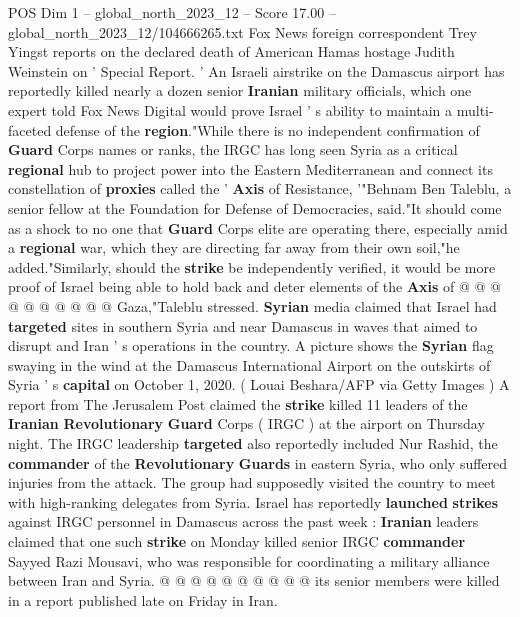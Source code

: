 \begin{textsample}{POS Dim 1 – global\_north\_2023\_12 – Score 17.00 – global\_north\_2023\_12/104666265.txt}  \label{ex:f1_pos_260}
Fox News foreign correspondent Trey Yingst reports on the declared death of American Hamas hostage Judith Weinstein on ' Special Report. ' An Israeli airstrike on the Damascus airport has reportedly killed nearly a dozen senior \textbf{Iranian} military officials, which one expert told Fox News Digital would prove Israel ' s ability to maintain a multi-faceted defense of the \textbf{region}."While there is no independent confirmation of \textbf{Guard} Corps names or ranks, the IRGC has long seen Syria as a critical \textbf{regional} hub to project power into the Eastern Mediterranean and connect its constellation of \textbf{proxies} called the ' \textbf{Axis} of Resistance, '"Behnam Ben Taleblu, a senior fellow at the Foundation for Defense of Democracies, said."It should come as a shock to no one that \textbf{Guard} Corps elite are operating there, especially amid a \textbf{regional} war, which they are directing far away from their own soil,"he added."Similarly, should the \textbf{strike} be independently verified, it would be more proof of Israel being able to hold back and deter elements of the \textbf{Axis} of @ @ @ @ @ @ @ @ @ @ Gaza,"Taleblu stressed. \textbf{Syrian} media claimed that Israel had \textbf{targeted} sites in southern Syria and near Damascus in waves that aimed to disrupt and Iran ' s operations in the country.
A picture shows the \textbf{Syrian} flag swaying in the wind at the Damascus International Airport on the outskirts of Syria ' s \textbf{capital} on October 1, 2020. ( Louai Beshara/AFP via Getty Images ) A report from The Jerusalem Post claimed the \textbf{strike} killed 11 leaders of the \textbf{Iranian} \textbf{Revolutionary} \textbf{Guard} Corps ( IRGC ) at the airport on Thursday night.
The IRGC leadership \textbf{targeted} also reportedly included Nur Rashid, the \textbf{commander} of the \textbf{Revolutionary} \textbf{Guards} in eastern Syria, who only suffered injuries from the attack.
The group had supposedly visited the country to meet with high-ranking delegates from Syria.
Israel has reportedly \textbf{launched} \textbf{strikes} against IRGC personnel in Damascus across the past week : \textbf{Iranian} leaders claimed that one such \textbf{strike} on Monday killed senior IRGC \textbf{commander} Sayyed Razi Mousavi, who was responsible for coordinating a military alliance between Iran and Syria. @ @ @ @ @ @ @ @ @ @ its senior members were killed in a report published late on Friday in Iran.

\end{textsample}
